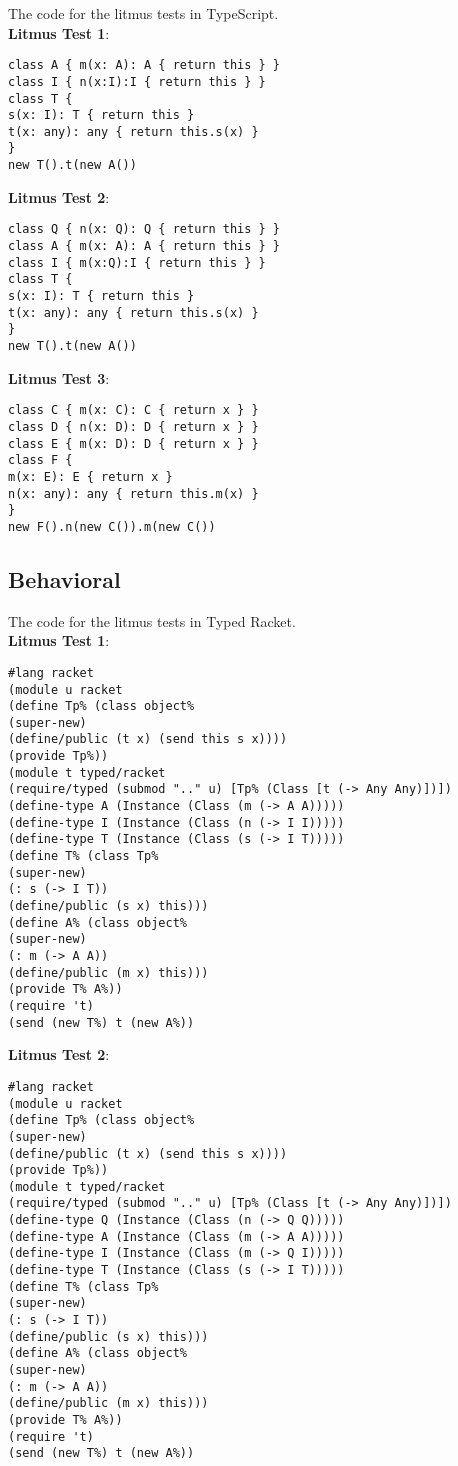 \documentclass[]{article}
\begin{document}
The code for the litmus tests in TypeScript. \\

\noindent\textbf{Litmus Test 1}:
\begin{verbatim}
class A { m(x: A): A { return this } }
class I { n(x:I):I { return this } }
class T {
s(x: I): T { return this }
t(x: any): any { return this.s(x) }
}
new T().t(new A())
\end{verbatim}

\noindent\textbf{Litmus Test 2}:
\begin{verbatim}
class Q { n(x: Q): Q { return this } }
class A { m(x: A): A { return this } }
class I { m(x:Q):I { return this } }
class T {
s(x: I): T { return this }
t(x: any): any { return this.s(x) }
}
new T().t(new A())
\end{verbatim}

\noindent\textbf{Litmus Test 3}:
\begin{verbatim}
class C { m(x: C): C { return x } }
class D { n(x: D): D { return x } }
class E { m(x: D): D { return x } }
class F {
m(x: E): E { return x }
n(x: any): any { return this.m(x) }
}
new F().n(new C()).m(new C())
\end{verbatim}

\subsection*{Behavioral}

The code for the litmus tests in Typed Racket. \\

\noindent\textbf{Litmus Test 1}:

\begin{verbatim}
#lang racket
(module u racket
(define Tp% (class object%
(super-new)
(define/public (t x) (send this s x))))
(provide Tp%))
(module t typed/racket
(require/typed (submod ".." u) [Tp% (Class [t (-> Any Any)])])
(define-type A (Instance (Class (m (-> A A)))))
(define-type I (Instance (Class (n (-> I I)))))
(define-type T (Instance (Class (s (-> I T)))))
(define T% (class Tp%
(super-new)
(: s (-> I T))
(define/public (s x) this)))
(define A% (class object%
(super-new)
(: m (-> A A))
(define/public (m x) this)))
(provide T% A%))
(require 't)
(send (new T%) t (new A%))
\end{verbatim}

\noindent\textbf{Litmus Test 2}:

\begin{verbatim}
#lang racket
(module u racket
(define Tp% (class object%
(super-new)
(define/public (t x) (send this s x))))
(provide Tp%))
(module t typed/racket
(require/typed (submod ".." u) [Tp% (Class [t (-> Any Any)])])
(define-type Q (Instance (Class (n (-> Q Q)))))
(define-type A (Instance (Class (m (-> A A)))))
(define-type I (Instance (Class (m (-> Q I)))))
(define-type T (Instance (Class (s (-> I T)))))
(define T% (class Tp%
(super-new)
(: s (-> I T))
(define/public (s x) this)))
(define A% (class object%
(super-new)
(: m (-> A A))
(define/public (m x) this)))
(provide T% A%))
(require 't)
(send (new T%) t (new A%))
\end{verbatim}
\end{document}
